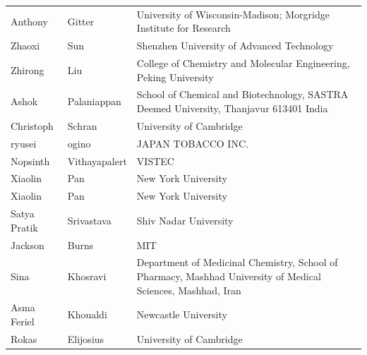 \documentclass{article}
\begin{document}
\begin{table}[]
\begin{tabular}{lll}
\rowcolor[HTML]{FFFFFF} 
{\color[HTML]{434343} Anthony} & {\color[HTML]{434343} Gitter} & {\color[HTML]{434343} University of Wisconsin-Madison; Morgridge Institute for Research} \\
\rowcolor[HTML]{F8F9FA} 
{\color[HTML]{434343} Zhaoxi} & {\color[HTML]{434343} Sun} & {\color[HTML]{434343} Shenzhen University of Advanced Technology} \\
\rowcolor[HTML]{FFFFFF} 
{\color[HTML]{434343} Zhirong} & {\color[HTML]{434343} Liu} & {\color[HTML]{434343} College of Chemistry and Molecular Engineering, Peking University} \\
\rowcolor[HTML]{F8F9FA} 
{\color[HTML]{434343} Ashok} & {\color[HTML]{434343} Palaniappan} & {\color[HTML]{434343} School of Chemical and Biotechnology, SASTRA Deemed University, Thanjavur 613401 India} \\
\rowcolor[HTML]{FFFFFF} 
{\color[HTML]{434343} Christoph} & {\color[HTML]{434343} Schran} & {\color[HTML]{434343} University of Cambridge} \\
\rowcolor[HTML]{F8F9FA} 
{\color[HTML]{434343} ryusei} & {\color[HTML]{434343} ogino} & {\color[HTML]{434343} JAPAN TOBACCO INC.} \\
\rowcolor[HTML]{FFFFFF} 
{\color[HTML]{434343} Nopsinth} & {\color[HTML]{434343} Vithayapalert} & {\color[HTML]{434343} VISTEC} \\
\rowcolor[HTML]{F8F9FA} 
{\color[HTML]{434343} Xiaolin} & {\color[HTML]{434343} Pan} & {\color[HTML]{434343} New York University} \\
\rowcolor[HTML]{FFFFFF} 
{\color[HTML]{434343} Xiaolin} & {\color[HTML]{434343} Pan} & {\color[HTML]{434343} New York University} \\
\rowcolor[HTML]{F8F9FA} 
{\color[HTML]{434343} Satya Pratik} & {\color[HTML]{434343} Srivastava} & {\color[HTML]{434343} Shiv Nadar University} \\
\rowcolor[HTML]{FFFFFF} 
{\color[HTML]{434343} Jackson} & {\color[HTML]{434343} Burns} & {\color[HTML]{434343} MIT} \\
\rowcolor[HTML]{F8F9FA} 
{\color[HTML]{434343} Sina} & {\color[HTML]{434343} Khosravi} & {\color[HTML]{434343} Department of Medicinal Chemistry, School of Pharmacy, Mashhad University of Medical Sciences, Mashhad, Iran} \\
\rowcolor[HTML]{FFFFFF} 
{\color[HTML]{434343} Asma Feriel} & {\color[HTML]{434343} Khoualdi} & {\color[HTML]{434343} Newcastle University} \\
\rowcolor[HTML]{F8F9FA} 
{\color[HTML]{434343} Rokas} & {\color[HTML]{434343} Elijosius} & {\color[HTML]{434343} University of Cambridge} \\

\end{tabular}
\end{table}
\end{document}
